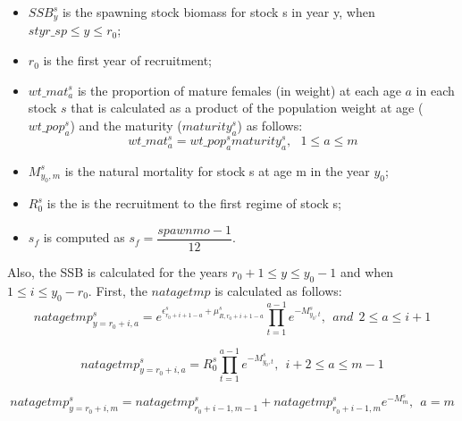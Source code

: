 \documentclass{article}
\begin{document}
\begin{itemize}
  
   \item $SSB^s_y$ is the spawning stock biomass for stock s in year y, when  $styr\_sp\leq y \leq r_0$;
   
   \item $r_0$ is the first year of recruitment;
   
   \item $wt\_{mat}^s_a$ is the proportion of mature females (in weight) at each age $a$ in each stock $s$ that is calculated as a product of the population weight at age ($wt\_pop^s_a$) and the maturity ($maturity^s_a$) as follows:
    \begin{equation}
        wt\_{mat}^s_a=wt\_pop^s_a maturity^s_a, \ \ \ 1\leq a \leq m 
    \end{equation}
        
    \item $M^s_{y_0,m}$ is the natural mortality for stock s at age m in the year $y_0$;
    
    \item $R^s_{0}$ is the is the recruitment to the first regime of stock s;

    \item $s_f$ is computed as $s_f=\dfrac{spawnmo-1}{12}$.

\end{itemize}

\hfill

Also, the SSB is calculated for the years $r_0+1 \leq y \leq y_0 - 1$ and when $1\leq i \leq y_0-r_0$. First, the $natagetmp$ is calculated as follows:\\

\begin{equation}
natagetmp^s_{y=r_0+i,a}= e^{\epsilon^s_{r_0+i+1-a}+\mu^s_{R,r_0+i+1-a}}\prod_{t=1}^{a-1}e^{-M^s_{y_0,t}}, \ \ and \ \ 2\leq a \leq i+1
\end{equation}


\begin{equation}
natagetmp^s_{y=r_0+i,a}=R^s_0\prod_{t=1}^{a-1}e^{-M^s_{y_0,t}}, \ \ i+2\leq  a \leq m-1
\end{equation}


\begin{equation}
natagetmp^s_{y=r_0+i,m}=natagetmp^s_{r_0+i-1,m-1}
+natagetmp^s_{r_0+i-1,m}e^{-M^s_{m}}, \ \ a=m
\end{equation}
\end{document}
